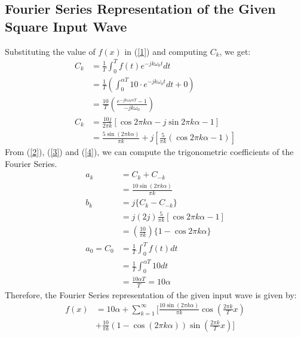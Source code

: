 \begin{multicols}{2}
\subsection{Fourier Series Representation of the Given Square Input Wave}
Substituting the value of $f(x)$ in (\ref{1}) and computing $C_k$, we get:
\begin{align}
C_k &= \frac{1}{T} \int_{0}^{T} f(t) e^{-j k \omega_0 t} dt\\
&= \frac{1}{T} \left( \int_{0}^{\alpha T} 10 \cdot e^{-j k \omega_0 t} dt+ 0\right)\\
&= \frac{10}{T} \left( \frac{e^{-j k \omega_0 \alpha T} - 1}{-j k \omega_0} \right)\\
C_k &= \frac{10 j}{2 \pi k} [\cos 2 \pi k \alpha - j \sin 2 \pi k \alpha - 1]\\ 
&= \frac{5  \sin (2 \pi k \alpha)}{ \pi k} + j \left[ \frac{5}{ \pi k} (\cos 2 \pi k \alpha -1) \right]
\end{align}
From (\ref{2}), (\ref{3}) and (\ref{4}), we can compute the trigonometric coefficients of the Fourier Series.
\begin{align}
a_k &= C_k + C_{-k} \\
&= \frac{10 \sin( 2 \pi k \alpha)}{\pi k} \\
b_k &= j \{ C_k - C_{-k} \} \\
&= j \left( 2 j \right) \frac{5}{ \pi k} [\cos 2 \pi k \alpha - 1]\\
&=\left( \frac{10}{ \pi k} \right) \{1 - \cos 2 \pi k \alpha\}\\
a_0 = C_0 &= \frac{1}{T} \int_{0}^{T} f(t) dt \\
&= \frac{1}{T} \int_{0}^{\alpha T} 10 dt \\
&= \frac{10\alpha T}{T} = 10\alpha
\end{align}
Therefore, the Fourier Series representation of the given input wave is given by: 
\begin{equation}
\begin{split}
f(x) &= 10\alpha + \sum_{k=1}^{\infty} \Bigg[ \frac{10 \sin (2 \pi k \alpha)}{\pi k} \cos\left(\frac{2\pi k}{T} x \right) \\
&+ \frac{10}{\pi k} (1 - \cos (2 \pi k \alpha)) \sin\left(\frac{2\pi k}{T} x \right) \Bigg]
\end{split}
\end{equation}


\end{multicols}
